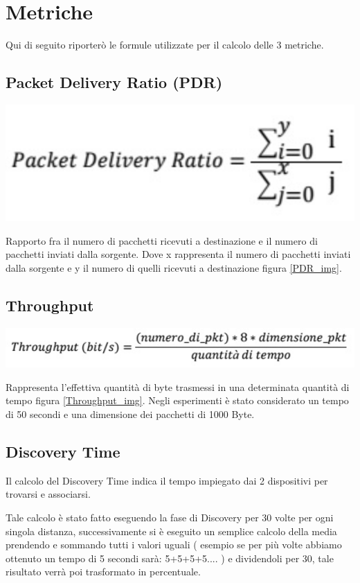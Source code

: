 \section{Metriche}
Qui di seguito riporterò le formule utilizzate per il calcolo delle 3 metriche.

\subsection{Packet Delivery Ratio (PDR)}
\begin{center}
\includegraphics[width=1\textwidth]{imgs/PDR.jpg}
\label{PDR_img}%
\end{center}

Rapporto fra il numero di pacchetti ricevuti a destinazione e il numero di pacchetti inviati dalla sorgente.
Dove x rappresenta il numero di pacchetti inviati dalla sorgente e y il numero di quelli ricevuti a destinazione figura \ref{PDR_img}. 

\subsection{Throughput}
\begin{center}
\includegraphics[width=1\textwidth]{imgs/Throughput.jpg}
\label{Throughput_img}%
\end{center}

Rappresenta l’effettiva quantità di byte trasmessi in una determinata quantità di tempo figura \ref{Throughput_img}.
Negli esperimenti è stato considerato un tempo di 50 secondi e una dimensione dei pacchetti di 1000 Byte.

\subsection{Discovery Time}

Il calcolo del Discovery Time indica il tempo impiegato dai 2 dispositivi per trovarsi e associarsi.

Tale calcolo è stato fatto eseguendo la fase di Discovery per 30 volte per ogni singola distanza, successivamente si è eseguito un semplice calcolo della media prendendo e sommando tutti i valori uguali ( esempio se per più volte abbiamo ottenuto un tempo di 5 secondi sarà: 5+5+5+5.... ) e dividendoli per 30, tale risultato verrà poi trasformato in percentuale.




\clearpage{\pagestyle{empty}\cleardoublepage}
